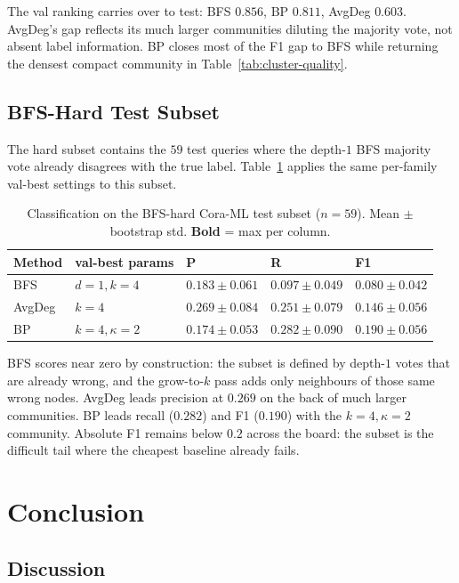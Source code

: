 \documentclass[11pt]{article}
\begin{document}
The val ranking carries over to test: BFS $0.856$, BP $0.811$, AvgDeg
$0.603$. AvgDeg's gap reflects its much larger communities diluting the
majority vote, not absent label information. BP closes most of the F1
gap to BFS while returning the densest compact community in
Table~\ref{tab:cluster-quality}.

\subsection{BFS-Hard Test Subset}
\label{sec:hard}

The hard subset contains the $59$ test queries where the depth-$1$ BFS
majority vote already disagrees with the true label.
Table~\ref{tab:hard-classification} applies the same per-family val-best
settings to this subset.

\begin{table}[t]
\centering
\footnotesize
\caption{Classification on the BFS-hard Cora-ML test subset ($n = 59$).
Mean $\pm$ bootstrap std. \textbf{Bold} = max per column.}
\label{tab:hard-classification}
\begin{tabular}{lllll}
\toprule
Method & val-best params      & P     & R     & F1 \\
\midrule
BFS    & $d = 1, k = 4$       & $0.183 \pm 0.061$ & $0.097 \pm 0.049$ & $0.080 \pm 0.042$ \\
AvgDeg & $k = 4$              & \textbf{$0.269 \pm 0.084$} & $0.251 \pm 0.079$ & $0.146 \pm 0.056$ \\
BP     & $k = 4, \kappa = 2$  & $0.174 \pm 0.053$ & \textbf{$0.282 \pm 0.090$} & \textbf{$0.190 \pm 0.056$} \\
\bottomrule
\end{tabular}
\end{table}

BFS scores near zero by construction: the subset is defined by depth-$1$
votes that are already wrong, and the grow-to-$k$ pass adds only
neighbours of those same wrong nodes. AvgDeg leads precision at $0.269$
on the back of much larger communities. BP leads recall ($0.282$) and F1
($0.190$) with the $k = 4, \kappa = 2$ community. Absolute F1 remains
below $0.2$ across the board: the subset is the difficult tail where the
cheapest baseline already fails.

\section{Conclusion}

\subsection{Discussion}
\end{document}
